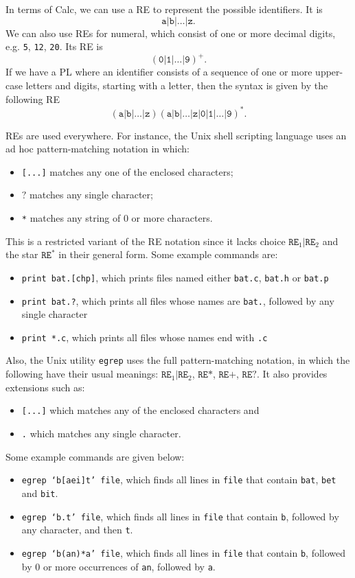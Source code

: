 \documentclass[a4paper, openany]{memoir}
\begin{document}
In terms of Calc, we can use a RE to represent the possible identifiers. It is
\[\texttt{a}|\texttt{b}|\dots|\texttt{z}.\]
We can also use REs for numeral, which consist of one or more decimal digits, e.g. \texttt{5}, \texttt{12}, \texttt{20}. Its RE is
\[(\texttt{0}|\texttt{1}|\dots|\texttt{9})^{\texttt{+}}.\]
If we have a PL where an identifier consists of a sequence of one or more upper-case letters and digits, starting with a letter, then the syntax is given by the following RE
\[(\texttt{a}|\texttt{b}|\dots|\texttt{z}) (\texttt{a}|\texttt{b}|\dots|\texttt{z}|\texttt{0}|\texttt{1}|\dots|\texttt{9})^{\texttt{*}}.\]

REs are used everywhere. For instance, the Unix shell scripting language uses an ad hoc pattern-matching notation in which:
\begin{itemize}
    \item \texttt{[...]} matches any one of the enclosed characters;
    \item $\texttt{?}$ matches any single character;
    \item \texttt{*} matches any string of 0 or more characters.
\end{itemize}
This is a restricted variant of the RE notation since it lacks choice $\texttt{RE}_1|\texttt{RE}_2$ and the star $\texttt{RE}^{\texttt{*}}$ in their general form. Some example commands are:
\begin{itemize}
    \item \texttt{print bat.[chp]}, which prints files named either \texttt{bat.c}, \texttt{bat.h} or \texttt{bat.p}
    \item \texttt{print bat.?}, which prints all files whose names are \texttt{bat.}, followed by any single character
    \item \texttt{print *.c}, which prints all files whose names end with \texttt{.c}
\end{itemize}

Also, the Unix utility \texttt{egrep} uses the full pattern-matching notation, in which the following have their usual meanings: $\texttt{RE}_1|\texttt{RE}_2$,  $\texttt{RE*}$, $\texttt{RE+}$, $\texttt{RE?}$. It also provides extensions such as:
\begin{itemize}
    \item \texttt{[...]} which matches any of the enclosed characters and
    \item \texttt{.} which matches any single character.
\end{itemize}
Some example commands are given below:
\begin{itemize}
    \item \texttt{egrep `b[aei]t' file}, which finds all lines in \texttt{file} that contain \texttt{bat}, \texttt{bet} and \texttt{bit}.
    \item \texttt{egrep `b.t' file}, which finds all lines in \texttt{file} that contain \texttt{b}, followed by any character, and then \texttt{t}.
    \item \texttt{egrep `b(an)*a' file}, which finds all lines in \texttt{file} that contain \texttt{b}, followed by 0 or more occurrences of \texttt{an}, followed by \texttt{a}.
\end{itemize}
\end{document}
